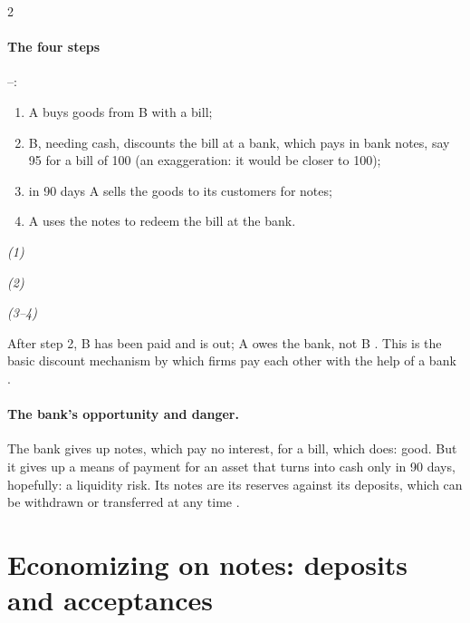 \begin{paracol}{2}
\paragraph{The four steps} --:
\begin{enumerate}
  \item A buys goods from B with a bill;
  \item B, needing cash, discounts the bill at a bank, which pays in bank notes, say 95 for a bill of 100 (an exaggeration: it would be closer to 100);
  \item in 90 days A sells the goods to its customers for notes;
  \item A uses the notes to redeem the bill at the bank.
\end{enumerate}
\begin{taccts}
\textit{(1)}\quad{}\quad
{}

\medskip
\textit{(2)}\quad{}\quad
{}

\medskip
\textit{(3--4)}\quad{}\quad
{}
\end{taccts}
After step 2, B has been paid and is out; A owes the bank, not B . This is the basic discount mechanism by which firms pay each
other with the help of a bank .

\paragraph{The bank's opportunity and danger.} The bank gives up notes, which pay no interest, for a bill, which does: good. But it gives up a means of payment for an asset
that turns into cash only in 90 days, hopefully: a liquidity risk. Its notes are its reserves against its deposits, which can be withdrawn or transferred at any time
.

\section{Economizing on notes: deposits and acceptances}\label{sec:bg-economizing}


\end{paracol}
